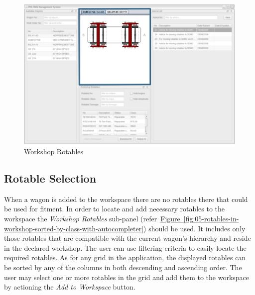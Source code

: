 \begin{figure}[!h]
\centering
\includegraphics[scale=0.37]{chapters/01-user-interface/images/08-workspace.png}
\caption{Workshop Rotables}\label{fig:08-workspace}
\end{figure}

\clearpage

\subsection{Rotable Selection}

When a wagon is added to the workspace there are no rotables there that could be used for fitment. In order to locate and add necessary rotables to the workspace the \emph{Workshop Rotables} sub-panel (refer~\hyperref[fig:05-rotables-in-workshop-sorted-by-class-with-autocompleter]{Figure~\ref*{fig:05-rotables-in-workshop-sorted-by-class-with-autocompleter}}) should be used. It includes only those rotables that are compatible with the current wagon's hierarchy and reside in the declared workshop.  The user can use filtering criteria to easily locate the required rotables. As for any grid in the application, the displayed rotables can be sorted by any of the columns in both descending and ascending order. The user may select one or more rotables in the grid and add them to the workspace by actioning the \emph{Add to Workspace} button.

